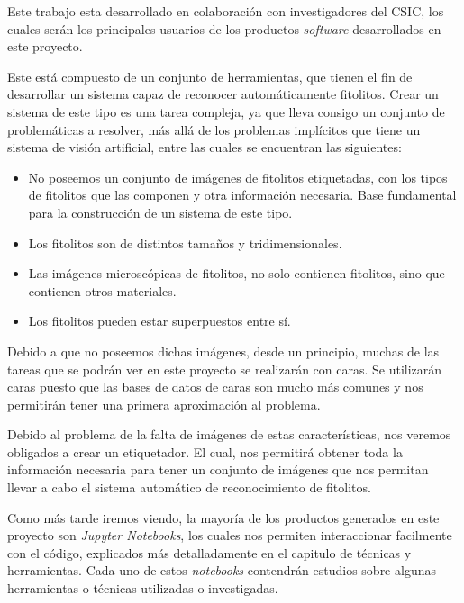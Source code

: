 

Este trabajo esta desarrollado en colaboración con investigadores del CSIC, los cuales serán los principales usuarios de los productos \textit{software} desarrollados en este proyecto.

Este está compuesto de un conjunto de herramientas, que tienen el fin de desarrollar un sistema capaz de reconocer automáticamente fitolitos. Crear un sistema de este tipo es una tarea compleja, ya que lleva consigo un conjunto de problemáticas a resolver, más allá de los problemas implícitos que tiene un sistema de visión artificial, entre las cuales se encuentran las siguientes:

\begin{itemize}
	\item No poseemos un conjunto de imágenes de fitolitos etiquetadas, con los tipos de fitolitos que las componen y otra información necesaria. Base fundamental para la construcción de un sistema de este tipo.
	\item Los fitolitos son de distintos tamaños y tridimensionales.
	\item Las imágenes microscópicas de fitolitos, no solo contienen fitolitos, sino que contienen otros materiales.
	\item Los fitolitos pueden estar superpuestos entre sí.
\end{itemize}

Debido a que no poseemos dichas imágenes, desde un principio, muchas de las tareas que se podrán ver en este proyecto se realizarán con caras. Se utilizarán caras puesto que las bases de datos de caras son mucho más comunes y nos permitirán tener una primera aproximación al problema.

Debido al problema de la falta de imágenes de estas características, nos veremos obligados a crear un etiquetador. El cual, nos permitirá obtener toda la información necesaria para tener un conjunto de imágenes que nos permitan llevar a cabo el sistema automático de reconocimiento de fitolitos.

Como más tarde iremos viendo, la mayoría de los productos generados en este proyecto son \textit{Jupyter Notebooks}, los cuales nos permiten interaccionar facilmente con el código, explicados más detalladamente en el capitulo de técnicas y herramientas. Cada uno de estos \textit{notebooks} contendrán estudios sobre algunas herramientas o técnicas utilizadas o investigadas.

